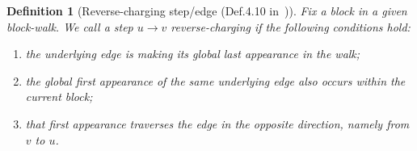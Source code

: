 \documentclass[12pt]{article}
\newtheorem{definition}[theorem]{Definition}
\begin{document}
\begin{definition}[Reverse-charging step/edge (Def.4.10 in~\cite{HKPX23})]
\label{def:reverse-charging}
    Fix a block in a given block-walk. We call a step \(u\to v\) \emph{reverse-charging} if the following conditions hold:
    \begin{enumerate}
        \item the underlying edge is making its global last appearance in the walk;
        \item the global first appearance of the same underlying edge also occurs within the current block;
        \item that first appearance traverses the edge in the opposite direction, namely from \(v\) to \(u\).
    \end{enumerate}
\end{definition}
% 
%
\end{document}
